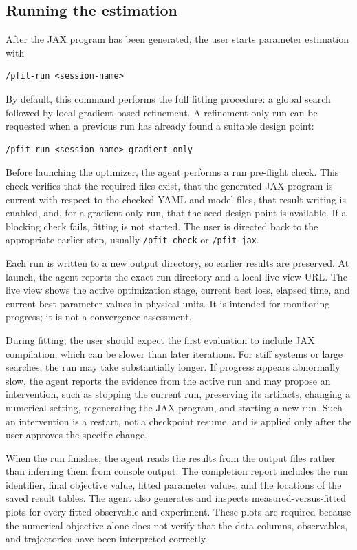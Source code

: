 \subsection{Running the estimation}
\label{sec:pfit-run}

After the JAX program has been generated, the user starts parameter estimation
with

\begin{verbatim}
/pfit-run <session-name>
\end{verbatim}

By default, this command performs the full fitting procedure: a global search
followed by local gradient-based refinement. A refinement-only run can be
requested when a previous run has already found a suitable design point:

\begin{verbatim}
/pfit-run <session-name> gradient-only
\end{verbatim}

Before launching the optimizer, the agent performs a run pre-flight check. This
check verifies that the required files exist, that the generated JAX program is
current with respect to the checked YAML and model files, that result writing is
enabled, and, for a gradient-only run, that the seed design point is available.
If a blocking check fails, fitting is not started. The user is directed back to
the appropriate earlier step, usually \texttt{/pfit-check} or
\texttt{/pfit-jax}.

Each run is written to a new output directory, so earlier results are preserved.
At launch, the agent reports the exact run directory and a local live-view URL.
The live view shows the active optimization stage, current best loss, elapsed
time, and current best parameter values in physical units. It is intended for
monitoring progress; it is not a convergence assessment.

During fitting, the user should expect the first evaluation to include JAX
compilation, which can be slower than later iterations. For stiff systems or
large searches, the run may take substantially longer. If progress appears
abnormally slow, the agent reports the evidence from the active run and may
propose an intervention, such as stopping the current run, preserving its
artifacts, changing a numerical setting, regenerating the JAX program, and
starting a new run. Such an intervention is a restart, not a checkpoint resume,
and is applied only after the user approves the specific change.

When the run finishes, the agent reads the results from the output files rather
than inferring them from console output. The completion report includes the run
identifier, final objective value, fitted parameter values, and the locations of
the saved result tables. The agent also generates and inspects
measured-versus-fitted plots for every fitted observable and experiment. These
plots are required because the numerical objective alone does not verify that
the data columns, observables, and trajectories have been interpreted correctly.

